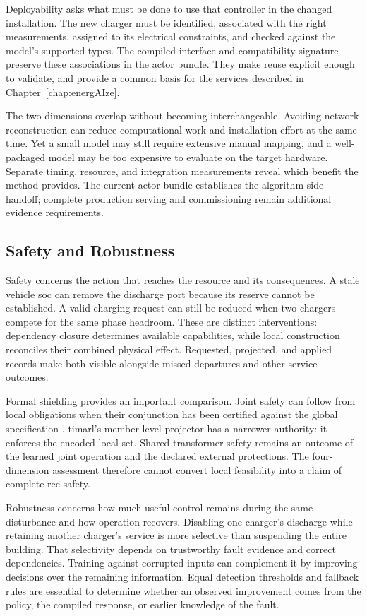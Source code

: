 Deployability asks what must be done to use that controller in the changed installation. The new charger must be identified, associated with the right measurements, assigned to its electrical constraints, and checked against the model's supported types. The compiled interface and compatibility signature preserve these associations in the actor bundle. They make reuse explicit enough to validate, and provide a common basis for the services described in Chapter~\ref{chap:energAIze}.

The two dimensions overlap without becoming interchangeable. Avoiding network reconstruction can reduce computational work and installation effort at the same time. Yet a small model may still require extensive manual mapping, and a well-packaged model may be too expensive to evaluate on the target hardware. Separate timing, resource, and integration measurements reveal which benefit the method provides. The current actor bundle establishes the algorithm-side handoff; complete production serving and commissioning remain additional evidence requirements.

\subsection{Safety and Robustness}

Safety concerns the action that reaches the resource and its consequences. A stale vehicle \gls{soc} can remove the discharge port because its reserve cannot be established. A valid charging request can still be reduced when two chargers compete for the same phase headroom. These are distinct interventions: dependency closure determines available capabilities, while local construction reconciles their combined physical effect. Requested, projected, and applied records make both visible alongside missed departures and other service outcomes.

Formal shielding provides an important comparison. Joint safety can follow from local obligations when their conjunction has been certified against the global specification \parencite{adalat2026contracts}. \gls{timarl}'s member-level projector has a narrower authority: it enforces the encoded local set. Shared transformer safety remains an outcome of the learned joint operation and the declared external protections. The four-dimension assessment therefore cannot convert local feasibility into a claim of complete \gls{rec} safety.

Robustness concerns how much useful control remains during the same disturbance and how operation recovers. Disabling one charger's discharge while retaining another charger's service is more selective than suspending the entire building. That selectivity depends on trustworthy fault evidence and correct dependencies. Training against corrupted inputs can complement it by improving decisions over the remaining information. Equal detection thresholds and fallback rules are essential to determine whether an observed improvement comes from the policy, the compiled response, or earlier knowledge of the fault.

